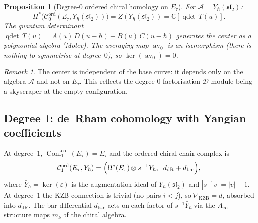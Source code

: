 \documentclass[11pt,reqno]{amsart}
\newtheorem{proposition}[theorem]{Proposition}
\theoremstyle{definition}
\theoremstyle{remark}
\newtheorem{remark}[theorem]{Remark}
\newcommand{\cA}{\mathcal{A}}
\newcommand{\cC}{\mathcal{C}}
\newcommand{\cD}{\mathcal{D}}
\newcommand{\Ainf}{A_{\infty}}
\DeclareMathOperator{\Conf}{Conf}
\DeclareMathOperator{\av}{av}
\newcommand{\CC}{\mathbb{C}}
\numberwithin{equation}{section}
\begin{document}
\begin{proposition}[Degree-$0$ ordered chiral homology on
$E_\tau$]
\label{prop:ell-degree0}
For $\cA = Y_\hbar(\mathfrak{sl}_2)$:
\begin{equation}\label{eq:ell-degree0}
  H^*\bigl(\cC_0^{\mathrm{ord}}(E_\tau,
  Y_\hbar(\mathfrak{sl}_2))\bigr)
  = Z(Y_\hbar(\mathfrak{sl}_2))
  = \CC[\operatorname{qdet}\,T(u)].
\end{equation}
The quantum determinant
$\operatorname{qdet}\,T(u) = A(u)\,D(u - \hbar)
- B(u)\,C(u - \hbar)$ generates the center as a
polynomial algebra \textup{(}Molev\textup{)}.
The averaging map $\av_0$ is an isomorphism
\textup{(}there is nothing to symmetrise at degree~$0$\textup{)},
so $\ker(\av_0) = 0$.
\end{proposition}

\begin{remark}
The center is independent of the base curve: it depends
only on the algebra $\cA$ and not on $E_\tau$. This reflects
the degree-$0$ factorisation $\cD$-module being a skyscraper at
the empty configuration.
\end{remark}

\subsection{Degree $1$: de~Rham cohomology with Yangian
coefficients}
\label{subsec:ell-degree1}

At degree~$1$,
$\Conf_1^{\mathrm{ord}}(E_\tau) = E_\tau$ and the ordered
chiral chain complex is
\begin{equation}\label{eq:ell-degree1-cx}
  \cC_1^{\mathrm{ord}}(E_\tau, Y_\hbar)
  = \Bigl(\Omega^*(E_\tau) \otimes s^{-1}\bar{Y}_\hbar,
  \;\; d_{\mathrm{dR}} + d_{\mathrm{bar}}\Bigr),
\end{equation}
where $\bar{Y}_\hbar = \ker(\varepsilon)$ is the
augmentation ideal of $Y_\hbar(\mathfrak{sl}_2)$ and
$|s^{-1}v| = |v| - 1$.
At degree~$1$ the KZB connection is trivial (no pairs
$i < j$), so $\nabla_{\mathrm{KZB}} = d$, absorbed into
$d_{\mathrm{dR}}$. The bar differential $d_{\mathrm{bar}}$
acts on each factor of $s^{-1}\bar{Y}_\hbar$ via the
$\Ainf$ structure maps $m_k$ of the chiral algebra.
\end{document}
